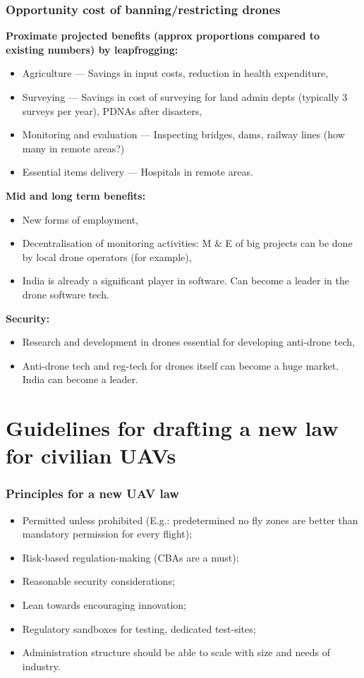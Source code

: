 \documentclass[10pt]{beamer}
\begin{document}
\begin{frame}[breakable]
  \frametitle{Opportunity cost of banning/restricting drones}
\textbf{Proximate projected benefits (approx proportions compared to existing numbers) by leapfrogging:}
  \begin{itemize}
  \item Agriculture --- Savings in input costs, reduction in health expenditure,
  \item Surveying --- Savings in cost of surveying for land admin depts (typically 3 surveys per year), PDNAs after disasters,
  \item Monitoring and evaluation --- Inspecting bridges, dams, railway lines (how many in remote areas?)
  \item Essential items delivery --- Hospitals in remote areas.
  \end{itemize}
\textbf{Mid and long term benefits:}
  \begin{itemize}
  \item New forms of employment,
  \item Decentralisation of monitoring activities: M \& E of big projects can be done by local drone operators (for example),
  \item India is already a significant player in software. Can become a leader in the drone software tech.
  \end{itemize}
  \textbf{Security:}
  \begin{itemize}
  \item Research and development in drones essential for developing anti-drone tech,
  \item Anti-drone tech and reg-tech for drones itself can become a huge market. India can become a leader.
  \end{itemize}
\end{frame}

\section{Guidelines for drafting a new law for civilian UAVs}

\begin{frame}
  \frametitle{Principles for a new UAV law}
  \begin{itemize}
  \item Permitted unless prohibited (E.g.: predetermined no fly zones are better than mandatory permission for every flight);
  \item Risk-based regulation-making (CBAs are a must);
  \item Reasonable security considerations;
  \item Lean towards encouraging innovation;
  \item Regulatory sandboxes for testing, dedicated test-sites;
  \item Administration structure should be able to scale with size and needs of industry.
  \end{itemize}
\end{frame}
\end{document}
